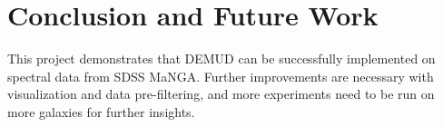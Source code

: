 \documentclass[10pt, letterpaper, notitlepage]{article}
\begin{document}
\section{Conclusion and Future Work}

This project demonstrates that DEMUD can be successfully implemented on spectral data from SDSS MaNGA. Further improvements
are necessary with visualization and data pre-filtering, and more experiments need to be run on more galaxies for further
insights.

\newpage


\end{document}
